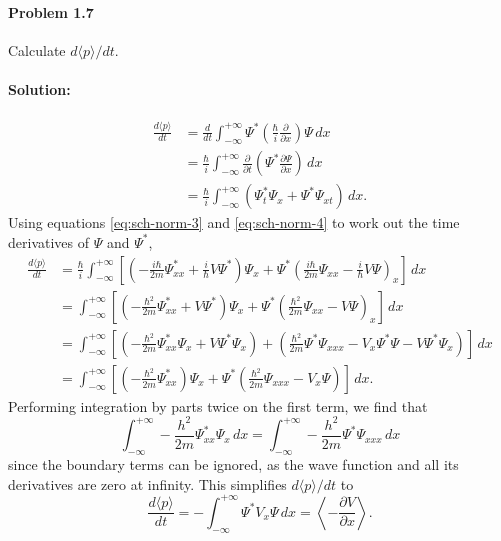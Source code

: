 \documentclass{article}
\begin{document}
\paragraph{Problem 1.7} Calculate $d\langle p \rangle/dt$.

\paragraph{Solution:} \begin{align*}
  \frac{d\langle p \rangle}{dt}
  &= \frac{d}{dt} \int_{-\infty}^{+\infty} \Psi^* \left(
    \frac{\hbar}{i}\frac{\partial}{\partial x}
  \right) \Psi \,dx \\
  &= \frac{\hbar}{i} \int_{-\infty}^{+\infty} \frac{\partial}{\partial t}\left(
  \Psi^*\frac{\partial \Psi}{\partial x}\right) \,dx \\
  &= \frac{\hbar}{i} \int_{-\infty}^{+\infty} \left(
    \Psi^*_t\Psi_x + \Psi^*\Psi_{xt}
  \right) \,dx.
\end{align*} Using equations \eqref{eq:sch-norm-3} and \eqref{eq:sch-norm-4} to
work out the time derivatives of $\Psi$ and $\Psi^*$, \begin{align*}
  \frac{d\langle p \rangle}{dt}
  &= \frac{\hbar}{i} \int_{-\infty}^{+\infty} \left[
    \left(
      -\frac{i\hbar}{2m}\Psi^*_{xx} + \frac{i}{\hbar}V\Psi^*
    \right)\Psi_x + \Psi^*\left(
      \frac{i\hbar}{2m}\Psi_{xx} - \frac{i}{\hbar}V\Psi
    \right)_x
  \right] \,dx \\
  &= \int_{-\infty}^{+\infty} \left[
    \left(
      -\frac{\hbar^2}{2m}\Psi^*_{xx} + V\Psi^*
    \right)\Psi_x + \Psi^*\left(
      \frac{\hbar^2}{2m}\Psi_{xx} - V\Psi
    \right)_x
  \right] \,dx \\
  &= \int_{-\infty}^{+\infty} \left[
    \left(
      -\frac{\hbar^2}{2m}\Psi^*_{xx}\Psi_x + V\Psi^*\Psi_x
    \right) + \left(
      \frac{\hbar^2}{2m}\Psi^*\Psi_{xxx} - V_x\Psi^*\Psi - V\Psi^*\Psi_x
    \right)
  \right] \,dx \\
  &= \int_{-\infty}^{+\infty} \left[
    \left(
      -\frac{\hbar^2}{2m}\Psi^*_{xx}
    \right)\Psi_x + \Psi^*\left(
      \frac{\hbar^2}{2m}\Psi_{xxx} - V_x\Psi
    \right)
  \right] \,dx.
\end{align*} Performing integration by parts twice on the first term, we find
that \begin{equation*}
  \int_{-\infty}^{+\infty}
    -\frac{h^2}{2m}\Psi^*_{xx}\Psi_x
  \,dx
  = \int_{-\infty}^{+\infty}
    -\frac{h^2}{2m}\Psi^*\Psi_{xxx}
  \,dx
\end{equation*} since the boundary terms can be ignored, as the wave function
and all its derivatives are zero at infinity. This simplifies $d\langle p
\rangle/dt$ to \begin{equation*}
  \frac{d\langle p \rangle}{dt} = -\int_{-\infty}^{+\infty} \Psi^* V_x\Psi \,dx
  = \left\langle -\frac{\partial V}{\partial x} \right\rangle.
\end{equation*}
\end{document}
